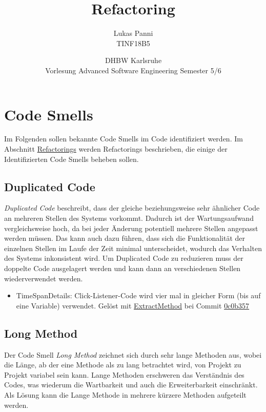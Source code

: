 \documentclass[12pt]{article}
\title{Refactoring}
\date{DHBW Karlsruhe\\ Vorlesung Advanced Software Engineering Semester 5/6}
\author{Lukas Panni \\ TINF18B5}
\begin{document}
\maketitle

\newpage

\tableofcontents

\newpage

\section{Code Smells} 

Im Folgenden sollen bekannte Code Smells im Code identifiziert werden. Im Abschnitt \hyperref[sec:Refactorings]{Refactorings} werden Refactorings beschrieben, die einige der Identifizierten Code Smells beheben sollen.


\subsection{Duplicated Code}

\textit{Duplicated Code} beschreibt, dass der gleiche beziehungsweise sehr ähnlicher Code an mehreren Stellen des Systems vorkommt.
Dadurch ist der Wartungsaufwand vergleichsweise hoch, da bei jeder Änderung potentiell mehrere Stellen angepasst werden müssen. Das kann auch dazu führen, dass sich die Funktionalität der einzelnen Stellen im Laufe der Zeit minimal unterscheidet, wodurch das Verhalten des Systems inkonsistent wird.
Um Duplicated Code zu reduzieren muss der doppelte Code ausgelagert werden und kann dann an verschiedenen Stellen wiederverwendet werden.

\begin{itemize}
	\item{TimeSpanDetails: Click-Listener-Code wird vier mal in gleicher Form (bis auf eine Variable) verwendet. Gelöst mit {\hyperref[sec:ExtractMethod_TimeSpanDetails]{ExtractMethod}} bei Commit \href{https://github.com/lukaspanni/OpenSourceStats/commit/0c0b357dee742575d8465ae26e64152bfecbf5ab} {0c0b357}}
		
\end{itemize}

\subsection{Long Method}

Der Code Smell \textit{Long Method} zeichnet sich durch sehr lange Methoden aus, wobei die Länge, ab der eine Methode als zu lang betrachtet wird, von Projekt zu Projekt variabel sein kann.
Lange Methoden erschweren das Verständnis des Codes, was wiederum die Wartbarkeit und auch die Erweiterbarkeit einschränkt. 
Als Lösung kann die Lange Methode in mehrere kürzere Methoden aufgeteilt werden.
\end{document}
